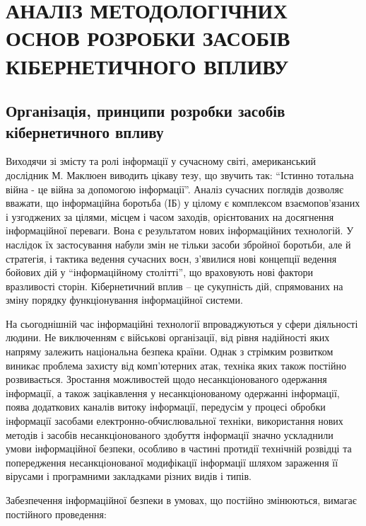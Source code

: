 \chapter{АНАЛІЗ МЕТОДОЛОГІЧНИХ ОСНОВ РОЗРОБКИ ЗАСОБІВ КІБЕРНЕТИЧНОГО ВПЛИВУ }
\label{1section::doc}\label{1section:id1}


\section{Організація, принципи розробки засобів кібернетичного впливу}
\label{1section:id2}
Виходячи зі змісту та ролі інформації у сучасному світі, американський дослідник М. Маклюен виводить цікаву тезу, що звучить так: ``Істинно тотальна війна - це війна за допомогою інформації''.
Аналіз сучасних поглядів дозволяє вважати, що інформаційна боротьба (ІБ) у цілому є комплексом взаємопов'язаних і узгоджених за цілями, місцем і часом заходів, орієнтованих на досягнення інформаційної переваги. Вона є результатом нових інформаційних технологій. У наслідок їх застосування набули змін не тільки засоби збройної боротьби, але й стратегія, і тактика ведення сучасних воєн, з'явилися нові концепції ведення бойових дій у ``інформаційному столітті'', що враховують нові фактори вразливості сторін.
Кібернетичний вплив – це сукупність дій, спрямованих на зміну порядку функціонування інформаційної системи. 

На сьогоднішній час інформаційні технології впроваджуються у сфери  діяльності людини. Не виключенням є військові організації, від рівня надійності яких напряму залежить національна безпека країни. Однак з стрімким розвитком виникає проблема захисту від комп'ютерних атак, техніка яких також постійно розвивається.
Зростання можливостей щодо несанкціонованого одержання інформації, а також зацікавлення у несанкціонованому одержанні інформації, поява додаткових каналів витоку інформації, передусім у процесі обробки інформації засобами електронно-обчислювальної техніки, використання нових методів і засобів несанкціонованого здобуття інформації значно ускладнили умови інформаційної безпеки, особливо в частині протидії технічній розвідці та попередження несанкціонованої модифікації інформації  шляхом зараження її вірусами і програмними  закладками різних видів і типів.

Забезпечення інформаційної безпеки в умовах, що постійно змінюються, вимагає постійного проведення:

